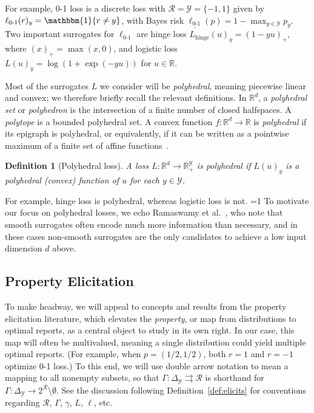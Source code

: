 \documentclass[12pt]{article}
\newcommand{\Comments}{1}
\newcommand{\mynote}[2]{\ifnum\Comments=1\textcolor{#1}{#2}\fi}
\newcommand{\mytodo}[2]{\ifnum\Comments=1%
  \todo[linecolor=#1!80!black,backgroundcolor=#1,bordercolor=#1!80!black]{#2}\fi}
\newcommand{\raft}[1]{\mytodo{green!20!white}{RF: #1}}
\newcommand{\jessie}[1]{\mynote{purple}{[JF: #1]}}
\newcommand{\reals}{\mathbb{R}}
\newcommand{\simplex}{\Delta_\Y}
\newcommand{\R}{\mathcal{R}}
\newcommand{\U}{\mathcal{U}}
\newcommand{\Y}{\mathcal{Y}}
\newcommand{\risk}[1]{\underline{#1}}
\newcommand{\toto}{\rightrightarrows}
\newcommand{\ones}{\mathbbm{1}}
\newcommand{\Ind}[1]{\ones\{#1\}}
\newcommand{\hinge}{L_{\mathrm{hinge}}}
\newcommand{\ellzo}{\ell_{\text{0-1}}}
\newtheorem{definition}{Definition}
\begin{document}
For example, 0-1 loss is a discrete loss with $\R = \Y = \{-1,1\}$
given by $\ellzo(r)_y = \Ind{r \neq y}$, with Bayes risk $\risk{\ellzo}(p) = 1-\max_{y\in\Y} p_y$.
Two important surrogates for $\ellzo$ are hinge loss $\hinge(u)_y = (1-yu)_+$, where $(x)_+ = \max(x,0)$, and logistic loss $L(u)_y = \log(1+\exp(-yu))$ for $u\in\reals$.

Most of the surrogates $L$ we consider will be \emph{polyhedral}, meaning piecewise linear and convex; we therefore briefly recall the relevant definitions.
In $\reals^d$, a \emph{polyhedral set} or \emph{polyhedron} is the intersection of a finite number of closed halfspaces.
A \emph{polytope} is a bounded polyhedral set.
A convex function $f:\reals^d\to\reals$ is \emph{polyhedral} if its epigraph is polyhedral, or equivalently, if it can be written as a pointwise maximum of a finite set of affine functions~\citep{rockafellar1997convex}.
%
\begin{definition}[Polyhedral loss]
  A loss $L: \reals^d \to \reals^{\Y}_+$ is \emph{polyhedral} if $L(u)_y$ is a polyhedral (convex) function of $u$ for each $y\in\Y$.
\end{definition}
%
For example, hinge loss is polyhedral, whereas logistic loss is not.
\raft{ADDED}
To motivate our focus on polyhedral losses, we echo Ramaswamy et al.~\cite[Section 1.2]{ramaswamy2018consistent}, who note that smooth surrogates often encode much more information than necessary, and in these cases non-smooth surrogates are the only candidates to achieve a low input dimension $d$ above.

\subsection{Property Elicitation}
\label{sec:property-elicitation}

To make headway, we will appeal to concepts and results from the property elicitation literature, which elevates the \emph{property}, or map from distributions to optimal reports, as a central object to study in its own right.
In our case, this map will often be multivalued, meaning a single distribution could yield multiple optimal reports.
(For example, when $p=(1/2,1/2)$, both $r=1$ and $r=-1$ optimize 0-1 loss.)
To this end, we will use double arrow notation to mean a mapping to all nonempty subsets, so that $\Gamma: \simplex \toto \R$ is shorthand for $\Gamma: \simplex \to 2^{\R} \setminus \emptyset$.
See the discussion following Definition~\ref{def:elicits} for conventions regarding $\R$, $\Gamma$, $\gamma$, $L$, $\ell$, etc.
\end{document}
